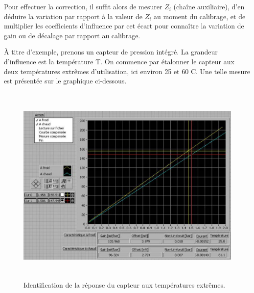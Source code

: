 \begin{center}
\end{center}

Pour effectuer la correction, il suffit alors de mesurer $Z_i$ (chaîne auxiliaire), d'en déduire la variation par rapport à la valeur de $Z_i$ au moment du calibrage, et de multiplier les coefficients d'influence par cet écart pour connaître la variation de gain ou de décalage par rapport au calibrage.

À titre d'exemple, prenons un capteur de pression intégré. La grandeur d'influence est la température T. On commence par étalonner le capteur aux deux températures extrêmes d'utilisation, ici environ 25 et 60 \degre C. Une telle mesure est présentée sur le graphique ci-dessous.

\begin{figure}
    \centering
    \includegraphics[height=10cm]{assets/figures/3_5_identification_reponse_en_temperature.PNG}
    \caption{ Identification de la réponse du capteur aux températures extrêmes.}
    \label{fig:IdentificationTemperature}
\end{figure}

